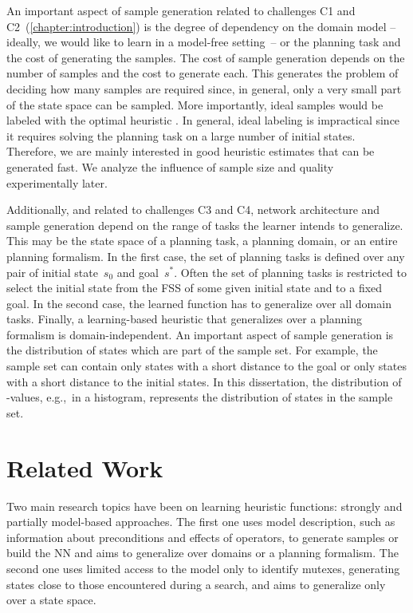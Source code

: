 An important aspect of sample generation related to challenges C1 and C2~(\cref{chapter:introduction}) is the degree of dependency on the domain model -- ideally, we would like to learn in a model-free setting~-- or the planning task and the cost of generating the samples. The cost of sample generation depends on the number of samples and the cost to generate each. This generates the problem of deciding how many samples are required since, in general, only a very small part of the state space can be sampled. More importantly, ideal samples would be labeled with the optimal heuristic \hstar. In general, ideal labeling is impractical since it requires solving the planning task on a large number of initial states. Therefore, we are mainly interested in good heuristic estimates that can be generated fast. We analyze the influence of sample size and quality experimentally later.

Additionally, and related to challenges C3 and C4, network architecture and sample generation depend on the range of tasks the learner intends to generalize. This may be the state space of a planning task, a planning domain, or an entire planning formalism. In the first case, the set of planning tasks is defined over any pair of initial state~$s_0$ and goal~$s^*$. Often the set of planning tasks is restricted to select the initial state from the FSS of some given initial state and to a fixed goal. In the second case, the learned function has to generalize over all domain tasks. Finally, a learning-based heuristic that generalizes over a planning formalism is domain-independent. An important aspect of sample generation is the distribution of states which are part of the sample set. For example, the sample set can contain only states with a short distance to the goal or only states with a short distance to the initial states. In this dissertation, the distribution of \hstar-values, e.g.,~in a histogram, represents the distribution of states in the sample set.

\section{Related Work}
\label{sec:related-work}

Two main research topics have been on learning heuristic functions: strongly and partially model-based approaches. The first one uses model description, such as information about preconditions and effects of operators, to generate samples or build the NN and aims to generalize over domains or a planning formalism. The second one uses limited access to the model only to identify mutexes, generating states close to those encountered during a search, and aims to generalize only over a state space.

